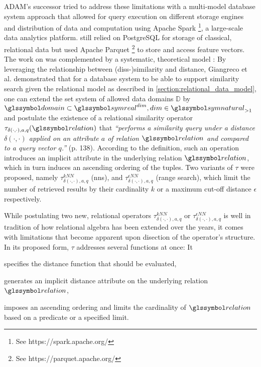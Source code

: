 ADAM's successor \adampro{} \cite{Giangreco:2016Adam} tried to address these limitations with a multi-model database system approach that allowed for query execution on different storage engines and distribution of data and computation using Apache Spark \footnote{See https://spark.apache.org/}, a large-scale data analytics platform. \adampro{} still relied on PostgreSQL for storage of classical, relational data but used Apache Parquet \footnote{See https://parquet.apache.org/} to store and access feature vectors. The work on \adampro{} was complemented by a systematic, theoretical model \cite{Giangreco:2018Database}: By leveraging the relationship between (diss-)similarity and distance, Giangreco et al. demonstrated that for a database system to be able to support similarity search given the relational model as described in \cref{section:relational_data_model}, one can extend the set system of allowed data domains $\mathbb{D}$ by $\domain \subset \symreal^{dim}, dim \in \symnatural_{>1}$ and postulate the existence of a relational similarity operator $\tau_{\delta(\cdot,\cdot),a,q}(\relation)$ that \emph{``performs a similarity query under a distance $\delta(\cdot,\cdot)$ applied on an attribute $a$ of relation $\relation$ and compared to a query vector $q$.''} \cite{Giangreco:2018Database} (p. 138). According to the definition, such an operation introduces an implicit attribute in the underlying relation $\relation$, which in turn induces an ascending ordering of the tuples. Two variants of $\tau$ were proposed, namely $\tau^{kNN}_{\delta(\cdot,\cdot),a,q}$ (\acrshort{nns}), and $\tau^{\epsilon NN}_{\delta(\cdot,\cdot),a,q}$ (range search), which limit the number of retrieved results by their cardinality $k$ or a maximum cut-off distance $\epsilon$ respectively.

While postulating two new, relational operators $\tau^{kNN}_{\delta(\cdot,\cdot),a,q}$ or $\tau^{\epsilon NN}_{\delta(\cdot,\cdot),a,q}$ is well in tradition of how relational algebra has been extended over the years, it comes with limitations that become apparent upon disection of the operator's structure. In its proposed form, $\tau$ addresses several functions at once: It
\begin{enumerate*}[label=(\roman*)]
    \item specifies the distance function that should be evaluated,
    \item generates an implicit distance attribute on the underlying relation $\relation$,
    \item imposes an ascending ordering and limits the cardinality of $\relation$ based on a predicate or a specified limit.
\end{enumerate*}

